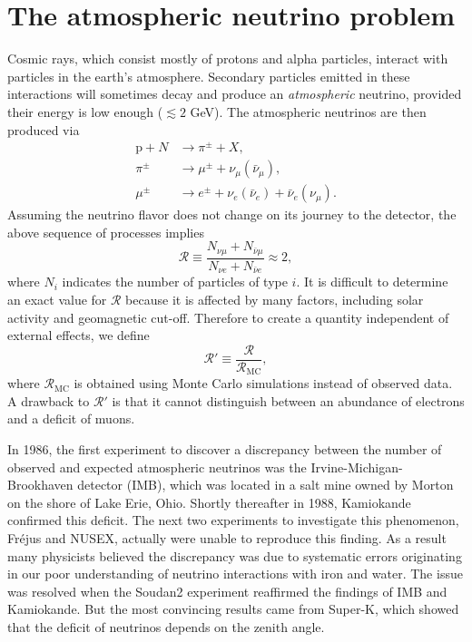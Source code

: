 \section{The atmospheric neutrino problem}
Cosmic rays, which consist mostly of protons and alpha particles, interact with
particles in the earth's atmosphere. Secondary particles emitted in these
interactions will sometimes decay and produce an {\it atmospheric} neutrino,
provided their energy is low enough ($\lesssim2$ GeV). The atmospheric neutrinos
are then produced via
\begin{equation}
  \begin{aligned}
    \text{p}+N&\to\pi^\pm+X, \\
    \pi^\pm&\to\mu^\pm+\nu_\mu(\bar{\nu}_\mu), \\
    \mu^\pm&\to e^\pm+\nu_e(\bar{\nu}_e)+\bar{\nu}_e(\nu_\mu).
  \end{aligned}
\end{equation}
Assuming the neutrino flavor does not change on its journey to the detector,
the above sequence of processes implies
\begin{equation}
  \mathcal{R}\equiv\frac{N_{\nu\mu}+N_{\bar{\nu}\mu}}
                           {N_{\nu e}+N_{\bar{\nu}e}}\approx2,
\end{equation}
where $N_i$ indicates the number of particles of type $i$.
It is difficult to determine an exact value for $\mathcal{R}$ because it is
affected by many factors, including solar activity and geomagnetic cut-off.
Therefore to create a quantity independent of external effects, we define
\begin{equation}
  \mathcal{R}'\equiv\frac{\mathcal{R}}{\mathcal{R}_\text{MC}},
\end{equation}
where $\mathcal{R}_\text{MC}$ is obtained using Monte Carlo simulations instead
of observed data. A drawback to $\mathcal{R}'$ is that it cannot distinguish
between an abundance of electrons and a deficit of muons.

In 1986, the first experiment to discover a discrepancy between the number of
observed and expected atmospheric neutrinos was the Irvine-Michigan-Brookhaven
detector (IMB), which was located in a salt mine owned by Morton on 
the shore of Lake
Erie, Ohio.  Shortly thereafter in 1988, Kamiokande confirmed this deficit.
The next two experiments to investigate this phenomenon, Fr\'ejus and NUSEX,
actually were unable to reproduce this finding. As a result many physicists
believed the discrepancy was due to systematic errors originating in our poor
understanding of neutrino interactions with iron and water. The issue was
resolved when the Soudan2 experiment reaffirmed the findings of IMB and
Kamiokande. But the most convincing results came from Super-K, which showed
that the deficit of neutrinos depends on the zenith angle.

